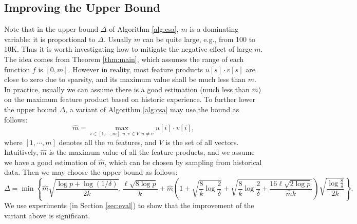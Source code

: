 \documentclass{article}
\begin{document}
\subsection{Improving the Upper Bound}
\label{sec:imprb}
Note that in the upper bound $\Delta$ of Algorithm \ref{alg:csa}, $m$ is a dominating variable: it is proportional to $\Delta$. Usually $m$ can be quite large, e.g., from 100 to 10K. Thus it is worth investigating how to mitigate the negative effect of large $m$. The idea comes from Theorem \ref{thm:main}, which assumes the range of each function $f$ is $[0,m]$. However in reality, most feature products $u[s]\cdot v[s]$ are close to zero due to sparsity, and its maximum value shall be much less than $m$. In practice, usually we can assume there is a good estimation (much less than $m$) on the maximum feature product based on historic experience. To further lower the upper bound $\Delta$, a variant of Algorithm \ref{alg:csa} may use the bound as follows:
$$\hat{m} = \max_{i\in [1,\cdots,m], u,v \in V, u\not= v}u[i]\cdot v[i],$$
where $[1,\cdots,m]$ denotes all the $m$ features, and $V$ is the set of all vectors. Intuitively, $\hat{m}$ is the maximum value of all the feature products, and we assume we have a good estimation of $\hat{m}$, which can be chosen by sampling from historical data. 
Then we may choose the upper bound as follows:
$$\Delta = \min\left\{\hat{m}\sqrt{\frac{\log p + \log(1/\delta)}{2k}}, \frac{\ell\sqrt{8\log p}}{k} +\hat{m}\left(1+\sqrt{\frac{8}{k}\log \frac{2}{\delta}} + \sqrt{\frac{8}{k}\log \frac{2}{\delta} + \frac{16\ell\sqrt{2\log p}}{\hat{m}k}}\right)\sqrt{\frac{\log \frac{8}{\delta}}{2k}}\right\}.$$
We use experiments (in Section \ref{sec:eval}) to show that the improvement of the variant above is significant. 
\end{document}
